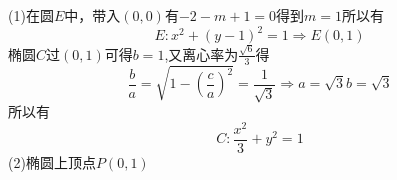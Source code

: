 (1)在圆$E$中，带入$(0,0)$有$-2-m+1=0$得到$m=1$所以有
\begin{equation}
E:{x^2} + {\left( {y - 1} \right)^2} = 1 \Rightarrow E\left( {0,1} \right)
\end{equation}
椭圆$C$过$(0,1)$可得$b=1$,又离心率为$\frac{{\sqrt 6 }}{3}$得
\begin{equation}
\frac{b}{a} = \sqrt {1 - {{\left( {\frac{c}{a}} \right)}^2}}  = \frac{1}{{\sqrt 3 }} \Rightarrow a = \sqrt 3 b = \sqrt 3
\end{equation}
所以有
\begin{equation}
C:\frac{{{x^2}}}{3} + {y^2} = 1
\end{equation}
(2)椭圆上顶点$P(0,1)$
